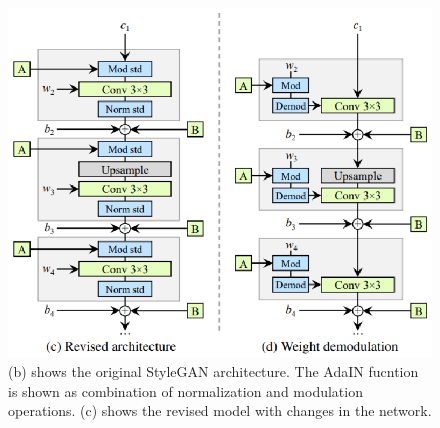 \documentclass[12pt,a4paper,openany]{book}
\begin{document}
\begin{figure}[ht!]
    \centering
    \includegraphics[scale=1.3]{figs/weight-demodulation.eps}
    \caption{(b) shows the original StyleGAN architecture. The AdaIN fucntion is shown as combination of normalization and modulation operations. (c) shows the revised model with changes in the network.}\label{Fig:STYLEGAN}
\end{figure}






\end{document}
